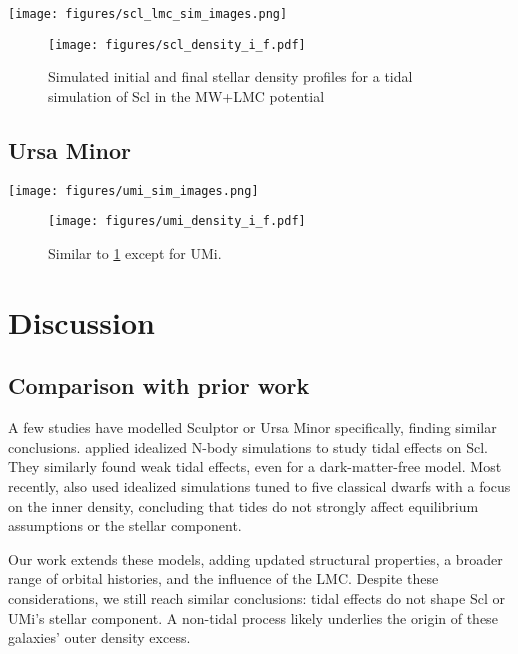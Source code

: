 \documentclass{aa}
\begin{document}
\begin{figure*}
    \centering
    \texttt{[image: figures/scl\_lmc\_sim\_images.png]}
    \caption{Snapshots of Scl in the LMC and MW potential.}
    \label{fig:scl_sim_images}
\end{figure*}

\begin{figure}
    \centering
    \texttt{[image: figures/scl\_density\_i\_f.pdf]}
    \caption{Simulated initial and final stellar density profiles for a tidal simulation of Scl in the MW+LMC potential} 
    \label{fig:scl_density_i_f}
\end{figure}


\subsection{Ursa Minor}
\begin{figure*}
    \centering
    \texttt{[image: figures/umi\_sim\_images.png]}
    \caption{Snapshots of UMi's tidal evolution in the MW potential}
    \label{fig:umi_sim_images}
\end{figure*}

\begin{figure}
    \centering
    \texttt{[image: figures/umi\_density\_i\_f.pdf]}
    \caption{Similar to \ref{fig:scl_density_i_f} except for UMi.} 
\end{figure}


\section{Discussion}

\subsection{Comparison with prior work}\label{comparison-with-prior-work}


A few studies have modelled Sculptor or Ursa Minor specifically, finding
similar conclusions. \citet{iorio+2019} applied idealized N-body
simulations to study tidal effects on Scl. They similarly found weak
tidal effects, even for a dark-matter-free model. Most recently,
\citet{tchiorniy+genina2025} also used idealized simulations tuned to
five classical dwarfs with a focus on the inner density, concluding that
tides do not strongly affect equilibrium assumptions or the stellar
component.

Our work extends these models, adding updated structural properties, a
broader range of orbital histories, and the influence of the LMC.
Despite these considerations, we still reach similar conclusions: tidal
effects do not shape Scl or UMi's stellar component. A non-tidal process
likely underlies the origin of these galaxies' outer density excess.
\end{document}
